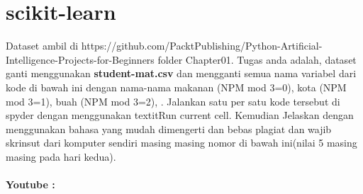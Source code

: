 \section{scikit-learn}
Dataset ambil di https://github.com/PacktPublishing/Python-Artificial-Intelligence-Projects-for-Beginners folder Chapter01.
Tugas anda adalah, dataset ganti menggunakan \textbf{student-mat.csv} dan mengganti semua nama variabel dari kode di bawah ini dengan nama-nama makanan (NPM mod 3=0), kota (NPM mod 3=1), buah (NPM mod 3=2), . Jalankan satu per satu kode tersebut di spyder dengan menggunakan textit{Run current cell}. Kemudian Jelaskan dengan menggunakan bahasa yang mudah dimengerti dan bebas plagiat dan wajib skrinsut dari komputer sendiri masing masing nomor di bawah ini(nilai 5 masing masing pada hari kedua).

\paragraph{\textbf Youtube :}

